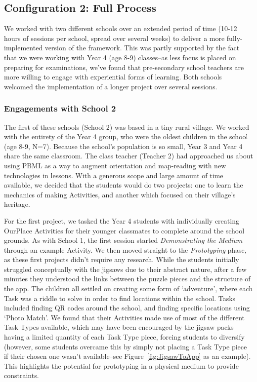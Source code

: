 \documentclass[,hyphens]{sigchi}
\begin{document}
\subsection{Configuration 2: Full Process}
We worked with two different schools over an extended period of time (10-12 hours of sessions per school, spread over several weeks) to deliver a more fully-implemented version of the framework. This was partly supported by the fact that we were working with Year 4 (age 8-9) classes--as less focus is placed on preparing for examinations, we've  found that pre-secondary school teachers are more willing to engage with experiential forms of learning. Both schools welcomed the implementation of a longer project over several sessions.

\subsubsection{Engagements with School 2}
The first of these schools (School 2) was based in a tiny rural village. We worked with the entirety of the Year 4 group, who were the oldest children in the school (age 8-9, N=7). Because the school's population is so small, Year 3 and Year 4 share the same classroom. The class teacher (Teacher 2) had approached us about using PBML as a way to augment orientation and map-reading with new technologies in lessons. With a generous scope and large amount of time available, we decided that the students would do two projects: one to learn the mechanics of making Activities, and another which focused on their village's heritage. 

For the first project, we tasked the Year 4 students with individually creating OurPlace Activities for their younger classmates to complete around the school grounds. As with School 1, the first session started \textit{Demonstrating the Medium} through an example Activity. We then moved straight to the \textit{Prototyping} phase, as these first projects didn't require any research. While the students initially struggled conceptually with the jigsaws due to their abstract nature, after a few minutes they understood the links between the puzzle pieces and the structure of the app. The children all settled on creating some form of `adventure', where each Task was a riddle to solve in order to find locations within the school. Tasks included finding QR codes around the school, and finding specific locations using `Photo Match'. We found that their Activities made use of most of the different Task Types available, which may have been encouraged by the jigsaw packs having a limited quantity of each Task Type piece, forcing students to diversify (however, some students overcame this by simply not placing a Task Type piece if their chosen one wasn't available--see Figure~\ref{fig:JigsawToApp} as an example). This highlights the potential for prototyping in a physical medium to provide constraints.
\end{document}
